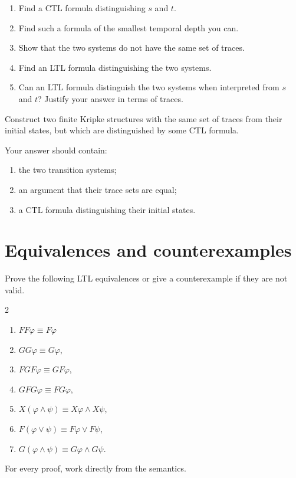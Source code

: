 \documentclass[11pt,a4paper]{tutorial}
\begin{document}
\begin{exercise}
\begin{enumerate}[label=(\alph*)]
  \item Find a CTL formula distinguishing $s$ and $t$.
  \item Find such a formula of the smallest temporal depth you can.
  \item Show that the two systems do not have the same set of traces.
  \item Find an LTL formula distinguishing the two systems.
  \item Can an LTL formula distinguish the two systems when interpreted from $s$ and $t$?
        Justify your answer in terms of traces.
\end{enumerate}
\end{exercise}


\begin{exercise}
Construct two finite Kripke structures with the same set of traces from their
initial states, but which are distinguished by some CTL formula.

Your answer should contain:
\begin{enumerate}[label=(\alph*)]
  \item the two transition systems;
  \item an argument that their trace sets are equal;
  \item a CTL formula distinguishing their initial states.
\end{enumerate}
\end{exercise}


\section{Equivalences and counterexamples}

\begin{exercise}
Prove the following LTL equivalences or give a counterexample if they are not valid.
\begin{multicols}{2}
\begin{enumerate}[label=(\alph*)]
\item $FF\varphi \equiv F\varphi$
\item $GG\varphi \equiv G\varphi$,
\item $FGF\varphi \equiv GF\varphi$,
\item $GFG\varphi \equiv FG\varphi$,
\item $X(\varphi\land\psi)\equiv X\varphi\land X\psi$,
\item $F(\varphi\lor\psi)\equiv F\varphi\lor F\psi$,
\item $G(\varphi\land\psi)\equiv G\varphi\land G\psi$.
\end{enumerate}
\end{multicols}
For every proof, work directly from the semantics.
\end{exercise}
\end{document}
